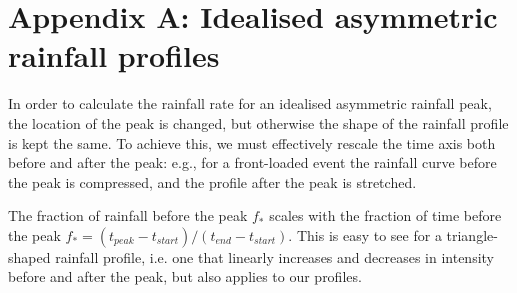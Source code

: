 \documentclass[APA,Times2COL]{WileyNJDv5}
\begin{document}





\section*{Appendix A: Idealised asymmetric rainfall profiles}\label{sec:app_profiles}

In order to calculate the rainfall rate for an idealised asymmetric rainfall peak, the location of the peak is changed, but otherwise the shape of the rainfall profile is kept the same. To achieve this, we must effectively rescale the time axis both before and after the peak: e.g., for a front-loaded event the rainfall curve before the peak is compressed, and the profile after the peak is stretched. 

The fraction of rainfall before the peak $f_*$ scales with the fraction of time before the peak $f_* = (t_{peak}-t_{start})/(t_{end}-t_{start})$. This is easy to see for a triangle-shaped rainfall profile, i.e. one that linearly increases and decreases in intensity before and after the peak, but also applies to our profiles.
\end{document}
